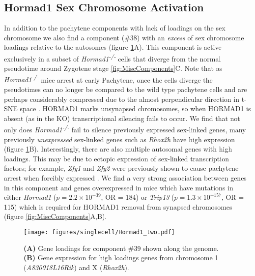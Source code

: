 \subsection{Hormad1 Sex Chromosome Activation}
In addition to the pachytene components with lack of loadings on the sex chromosome we also find a component (\#38) with an \textit{excess} of sex chromosome loadings relative to the autosomes (figure \ref{fig:Hormad1}A).
This component is active exclusively in a subset of \textit{Hormad1\textsuperscript{-/-}} cells that diverge from the normal pseudotime around Zygotene stage \ref{fig:MiscComponents}C.
Note that as \textit{Hormad1\textsuperscript{-/-}} mice arrest at early Pachytene, once the cells diverge the pseudotimes can no longer be compared to the wild type pachytene cells and are perhaps considerably compressed due to the almost perpendicular direction in t-SNE space \parencite{Shin2010Hormad1}.
HORMAD1 marks unsynapsed chromosomes, so when HORMAD1 is absent (as in the KO) transcriptional silencing fails to occur.
We find that not only does \textit{Hormad1\textsuperscript{-/-}} fail to silence previously expressed sex-linked genes, many previously \textit{unexpressed} sex-linked genes such as \textit{Rhox2h} have high expression (figure \ref{fig:Hormad1}B).
Interestingly, there are also multiple autosomal genes with high loadings.
This may be due to ectopic expression of sex-linked transcription factors; for example, \textit{Zfy1} and \textit{Zfy2} were previously shown to cause pachytene arrest when forcibly expressed \parencite{Royo2010Evidence}.
We find a very strong association between genes in this component and genes overexpressed in mice which have mutations in either \textit{Hormad1} ($p = 2.2\times10^{-39}$, OR = 184) or \textit{Trip13} ($p = 1.3\times10^{-157}$, OR = 115) which is required for HORMAD1 removal from synapsed chromosomes  \parencite{Ortega2016Surveillance, Wojtasz2009Mouse} (figure \ref{fig:MiscComponents}A,B).

\begin{figure}[H]
	\centering
	\texttt{[image: figures/singlecell/Hormad1\_two.pdf]}
	\caption[Hormad1 KO Component]{
		\textbf{(A)} Gene loadings for component \#39 shown along the genome.
		\textbf{(B)} Gene expression for high loadings genes from chromosome 1 (\textit{A830018L16Rik}) and X (\textit{Rhox2h}).
	}
	\label{fig:Hormad1}
\end{figure}


